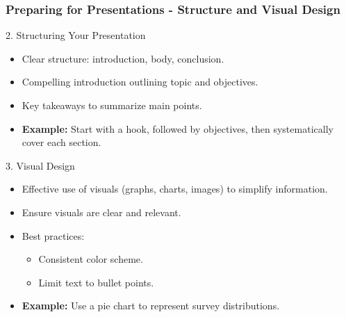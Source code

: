 \documentclass[aspectratio=169]{beamer}
\begin{document}
\begin{frame}[fragile]
    \frametitle{Preparing for Presentations - Structure and Visual Design}
    \begin{block}{2. Structuring Your Presentation}
        \begin{itemize}
            \item Clear structure: introduction, body, conclusion.
            \item Compelling introduction outlining topic and objectives.
            \item Key takeaways to summarize main points.
            \item \textbf{Example:} Start with a hook, followed by objectives, then systematically cover each section.
        \end{itemize}
    \end{block}

    \begin{block}{3. Visual Design}
        \begin{itemize}
            \item Effective use of visuals (graphs, charts, images) to simplify information.
            \item Ensure visuals are clear and relevant.
            \item Best practices: 
                \begin{itemize}
                    \item Consistent color scheme.
                    \item Limit text to bullet points.
                \end{itemize}
            \item \textbf{Example:} Use a pie chart to represent survey distributions.
        \end{itemize}
    \end{block}
\end{frame}
\end{document}
